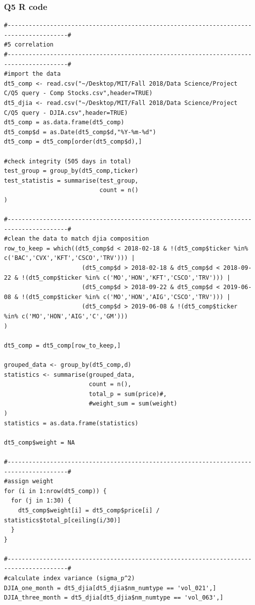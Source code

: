 \documentclass[10pt]{article}
\begin{document}
\subsubsection*{Q5 R code}
\begin{lstlisting}
#---------------------------------------------------------------------------------------#
#5 correlation
#---------------------------------------------------------------------------------------#
#import the data
dt5_comp <- read.csv("~/Desktop/MIT/Fall 2018/Data Science/Project C/Q5 query - Comp Stocks.csv",header=TRUE)
dt5_djia <- read.csv("~/Desktop/MIT/Fall 2018/Data Science/Project C/Q5 query - DJIA.csv",header=TRUE)
dt5_comp = as.data.frame(dt5_comp)
dt5_comp$d = as.Date(dt5_comp$d,"%Y-%m-%d")
dt5_comp = dt5_comp[order(dt5_comp$d),]

#check integrity (505 days in total)
test_group = group_by(dt5_comp,ticker)
test_statistis = summarise(test_group,
                           count = n()
)

#---------------------------------------------------------------------------------------#
#clean the data to match djia composition
row_to_keep = which((dt5_comp$d < 2018-02-18 & !(dt5_comp$ticker %in% c('BAC','CVX','KFT','CSCO','TRV'))) | 
                      (dt5_comp$d > 2018-02-18 & dt5_comp$d < 2018-09-22 & !(dt5_comp$ticker %in% c('MO','HON','KFT','CSCO','TRV'))) |
                      (dt5_comp$d > 2018-09-22 & dt5_comp$d < 2019-06-08 & !(dt5_comp$ticker %in% c('MO','HON','AIG','CSCO','TRV'))) |
                      (dt5_comp$d > 2019-06-08 & !(dt5_comp$ticker %in% c('MO','HON','AIG','C','GM')))
)

dt5_comp = dt5_comp[row_to_keep,]

grouped_data <- group_by(dt5_comp,d)
statistics <- summarise(grouped_data,
                        count = n(),
                        total_p = sum(price)#,
                        #weight_sum = sum(weight)
) 
statistics = as.data.frame(statistics)

dt5_comp$weight = NA

#---------------------------------------------------------------------------------------#
#assign weight
for (i in 1:nrow(dt5_comp)) {
  for (j in 1:30) {
    dt5_comp$weight[i] = dt5_comp$price[i] / statistics$total_p[ceiling(i/30)]
  }
}

#---------------------------------------------------------------------------------------#
#calculate index variance (sigma_p^2)
DJIA_one_month = dt5_djia[dt5_djia$nm_numtype == 'vol_021',]
DJIA_three_month = dt5_djia[dt5_djia$nm_numtype == 'vol_063',]


\end{lstlisting}
\end{document}

